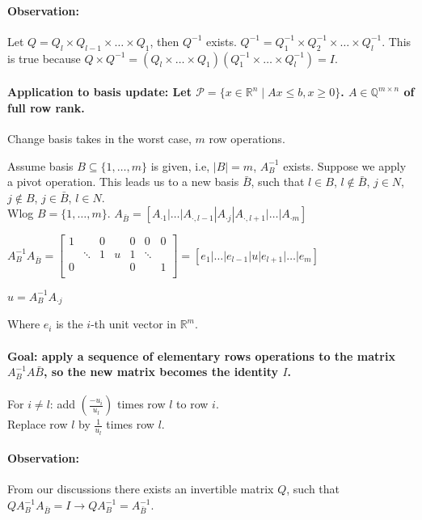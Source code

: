 \documentclass[main]{subfiles}
\begin{document}
\paragraph{Observation:}
Let $Q = Q_l \times Q_{l-1} \times \dots \times Q_1$, then $Q^{-1}$ exists.
$Q^{-1} = Q^{-1}_1 \times Q^{-1}_2 \times \dots \times Q^{-1}_l$. This is true
because $Q \times Q^{-1} = (Q_l \times \dots \times Q_1)(Q^{-1}_1 \times \dots
\times Q^{-1}_l) = I$.

\paragraph{Application to basis update: Let $\mathcal{P} = \{x \in
\mathbb{R}^n \mid Ax \leq b, x \geq 0\}$. $A \in \mathbb{Q}^{m \times n}$ of
full row rank.}
Change basis takes in the worst case, $m$ row operations.


Assume basis $B \subseteq \{1, \dots, m\}$ is given, i.e, $|B| = m$, $A^{-1}_B$
exists. Suppose we apply a pivot operation. This leads us to a new basis
$\bar{B}$, such that $l \in B$, $l \notin \bar{B}$, $j \in N$, $j \notin B$,
$j \in \bar{B}$, $l \in N$.\\
Wlog $B = \{1, \dots, m\}$. $A_{\bar{B}} = [A_{\cdot 1} | \dots |
A_{\cdot, l-1} | A_{\cdot j} | A_{\cdot ,l+1} |\dots |A_{\cdot m}]$

$A^{-1}_B A_{\bar{B}} =
\left[
\begin{array}{ccc|c|ccc}
1 &  & 0 & & 0 & 0 & 0 \\
 & \ddots & 1 & u & 1 & \ddots & \\
0 & &  &  & 0 & & 1\\
\end{array}
\right]
=
[e_1 | \dots | e_{l-1} | u |e_{l+1} | \dots | e_m ]$

$u = A^{-1}_B A_{\cdot j }$

Where $e_i$ is the $i$-th unit vector in $\mathbb{R}^m$.

\paragraph{Goal: apply a sequence of elementary rows operations to the matrix
$A^{-1}_B A{\bar{B}}$, so the new matrix becomes the identity $I$.}

For $i \neq l$: add $(\frac{-u_i}{u_l})$ times row $l$ to row $i$.\\
Replace row $l$ by $\frac{1}{u_l}$ times row $l$.

\paragraph{Observation:} From our discussions there exists an invertible matrix
$Q$, such that $Q A^{-1}_B A_{\bar{B}} = I \rightarrow Q A^{-1}_B =
A^{-1}_{\bar{B}}$.
\end{document}
